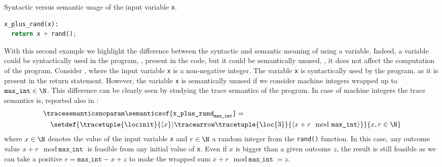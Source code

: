 \begin{example}
  \begin{marginlisting}
    \caption{Syntactic versus semantic usage of the input variable \texttt{x}.}
    \vspace{2\lineheight}
  \begin{lstlisting}[style=mystyle,language=Python]
x_plus_rand(x):
  return x + rand();
 \end{lstlisting}
  \end{marginlisting}
With this second example we highlight the difference between the syntactic and semantic meaning of using a variable. Indeed, a variable could be syntactically used in the program, \ie, present in the code, but it could be semantically unused, \ie, it does not affect the computation of the program.
Consider , where the input variable \texttt{x} is a non-negative integer.
The variable \texttt{x} is syntactically used by the program, as it is present in the return statement.
However, the variable \texttt{x} is semantically unused if we consider machine integers wrapped up to $\texttt{max\_int}\in\N$.
This difference can be clearly seen by studying the trace semantics of the program. In case of machine integers the trace semantics is, reported also in :
\begin{align*}
  &\tracesemanticsnoparam\semanticsof{\texttt{x\_plus\_rand}_{\texttt{max\_int}}}
  =\\
  &\quad\setdef{
    \tracetuple{\locinit}{\langle{x}}\rangle\tracearrow\tracetuple{\loc{3}}{\langle{x+r \mod \texttt{max\_int}}\rangle}
  }{x, r \in \N}
\end{align*}
where $x\in\N$ denotes the value of the input variable \texttt{x} and $r\in\N$ a random integer from the \texttt{rand()} function.
In this case, any outcome value $x+r \mod \texttt{max\_int}$ is feasible from any initial value of \texttt{x}.
Even if $x$ is bigger than a given outcome $z$, the result is still feasible as we can take a positive $r = \texttt{max\_int} - x + z$ to make the wrapped sum $x + r \mod \texttt{max\_int} = z$.
\begin{marginfigure}[*-10]
\end{marginfigure}
\end{example}
